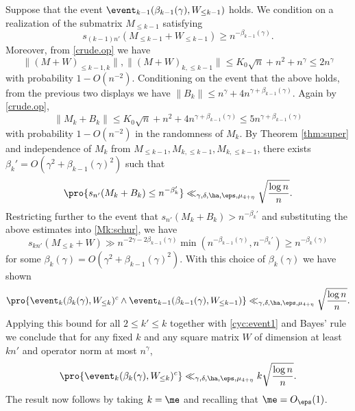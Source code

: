 \documentclass[aop,preprint]{imsart}
\theoremstyle{plain}
\theoremstyle{definition}
\theoremstyle{remark}
\numberwithin{equation}{section}
\numberwithin{theorem}{section}
\begin{document}
Suppose that the event $\event_{k-1}(\beta_{k-1}(\gamma),W_{\le k-1})$ holds.
We condition on a realization of the submatrix $M_{\le k-1}$ satisfying
\begin{equation}
s_{(k-1)n'}(M_{\le k-1}+W_{\le k-1}) \ge n^{-\beta_{k-1}(\gamma)}.
\end{equation}
Moreover, from \eqref{crude.op} we have
\begin{equation}
\|(M+W)_{\le k-1, k}\|, \|(M+W)_{k,\le k-1}\| \le K_0\sqrt{n}+n^2+n^\gamma\le 2n^\gamma
\end{equation}
with probability $1-O(n^{-2})$. Conditioning on the event that the above holds, from the previous two displays we have
$
\|B_k\| \le n^\gamma+ 4n^{\gamma + \beta_{k-1}(\gamma)}.
$
Again by \eqref{crude.op},
\begin{equation}
\|M_k+ B_k\|\le K_0\sqrt{n}+n^2 + 4n^{\gamma+\beta_{k-1}(\gamma)} \le 5n^{\gamma+\beta_{k-1}(\gamma)}
\end{equation}
with probability $1-O(n^{-2})$ in the randomness of $M_k$. 
By Theorem \ref{thm:super} and independence of $M_k$ from $M_{\le k-1},M_{k,\le k-1},M_{k,\le k-1}$, there exists $\beta_k' = O(\gamma^2 + \beta_{k-1}(\gamma)^2)$ such that 
\begin{equation}	\label{MkBk:bound}
\pro{s_{n'}(M_k+B_k) \le n^{-\beta_k'}} \ll_{\gamma,\delta,\ha,\eps,\mu_{4+\eta}} \sqrt{\frac{\log n}{n}}.
\end{equation}
Restricting further to the event that $s_{n'}(M_k+B_k) > n^{-\beta_k'}$ and substituting the above estimates into \eqref{Mk:schur}, we have
\begin{equation}
s_{kn'}(M_{\le k}+W) \gg n^{-2\gamma-2\beta_{k-1}(\gamma)}\min(n^{-\beta_{k-1}(\gamma)}, n^{-\beta_k'}) \ge n^{-\beta_k(\gamma)}
\end{equation}
for some $\beta_k(\gamma) = O(\gamma^2 + \beta_{k-1}(\gamma)^2)$. 
With this choice of $\beta_k(\gamma)$ we have shown
\begin{equation}
\pro{ \event_k(\beta_{k}(\gamma), W_{\le k})^c \wedge \event_{k-1}(\beta_{k-1}(\gamma),W_{\le k-1})}  \ll_{\gamma,\delta,\ha,\eps,\mu_{4+\eta}} \sqrt{\frac{\log n}{n}}.
\end{equation}
Applying this bound for all $2\le k'\le k$ together with \eqref{cyc:event1} and Bayes' rule we conclude that for any fixed $k$ and any square matrix $W$ of dimension at least $kn'$ and operator norm at most $n^\gamma$,
\begin{equation}
\pro{ \event_k(\beta_{k}(\gamma), W_{\le k})^c }  \ll_{\gamma,\delta,\ha,\eps,\mu_{4+\eta}} k \sqrt{\frac{\log n}{n}}.
\end{equation}
The result now follows by taking $k=\me $ and recalling that $\me =O_\eps(1)$. 
\end{document}

